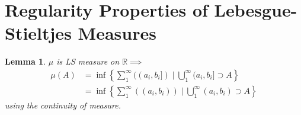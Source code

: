 \documentclass{report}
\newcommand{\R}{\mathbb{R}}
\newtheorem{lemma}[theorem]{Lemma}
\theoremstyle{definition}
\theoremstyle{remark}
\begin{document}
\section{Regularity Properties of Lebesgue-Stieltjes Measures}
\begin{lemma}
$\mu$ is LS measure on $\R \implies$ 
\begin{align*}
    \mu(A) & = \inf\left\{\sum_1^\infty((a_i, b_i]) \mid \bigcup_1^\infty(a_i, b_i] \supset A\right\} \\
           & =\inf\left\{
\sum_1^\infty((a_i, b_i)) \mid \bigcup_1^\infty(a_i, b_i) \supset A\right\}
\end{align*}
using the continuity of measure.
\end{lemma}
\end{document}
